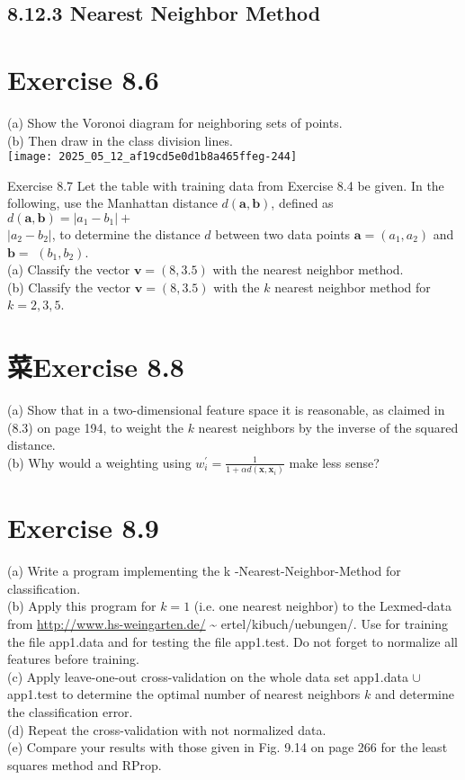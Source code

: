 \documentclass[10pt]{article}
\begin{document}
\subsection*{8.12.3 Nearest Neighbor Method}
\section*{Exercise 8.6}
(a) Show the Voronoi diagram for neighboring sets of points.\\
(b) Then draw in the class division lines.\\
\texttt{[image: 2025\_05\_12\_af19cd5e0d1b8a465ffeg-244]}

Exercise 8.7 Let the table with training data from Exercise 8.4 be given. In the following, use the Manhattan distance $d(\boldsymbol{a}, \boldsymbol{b})$, defined as $d(\boldsymbol{a}, \boldsymbol{b})=\left|a_{1}-b_{1}\right|+$\\
$\left|a_{2}-b_{2}\right|$, to determine the distance $d$ between two data points $\boldsymbol{a}=\left(a_{1}, a_{2}\right)$ and $\boldsymbol{b}=$ $\left(b_{1}, b_{2}\right)$.\\
(a) Classify the vector $\boldsymbol{v}=(8,3.5)$ with the nearest neighbor method.\\
(b) Classify the vector $\boldsymbol{v}=(8,3.5)$ with the $k$ nearest neighbor method for $k=2,3,5$.

\section*{菜Exercise 8.8}
(a) Show that in a two-dimensional feature space it is reasonable, as claimed in (8.3) on page 194, to weight the $k$ nearest neighbors by the inverse of the squared distance.\\
(b) Why would a weighting using $w_{i}^{\prime}=\frac{1}{1+\alpha d\left(\boldsymbol{x}, \boldsymbol{x}_{i}\right)}$ make less sense?

\section*{Exercise 8.9}
(a) Write a program implementing the k -Nearest-Neighbor-Method for classification.\\
(b) Apply this program for $k=1$ (i.e. one nearest neighbor) to the Lexmed-data from \href{http://www.hs-weingarten.de/}{http://www.hs-weingarten.de/} \~{} ertel/kibuch/uebungen/. Use for training the file app1.data and for testing the file app1.test. Do not forget to normalize all features before training.\\
(c) Apply leave-one-out cross-validation on the whole data set app1.data $\cup$ app1.test to determine the optimal number of nearest neighbors $k$ and determine the classification error.\\
(d) Repeat the cross-validation with not normalized data.\\
(e) Compare your results with those given in Fig. 9.14 on page 266 for the least squares method and RProp.
\end{document}
